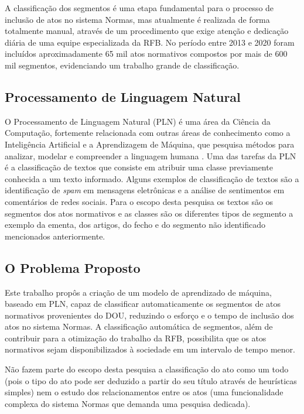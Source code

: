 A classificação dos segmentos é uma etapa fundamental para o processo de inclusão de atos no sistema Normas, mas atualmente é realizada de forma totalmente manual, através de um procedimento que exige atenção e dedicação diária de uma equipe especializada da RFB. No período entre 2013 e 2020 foram incluídos aproximadamente 65 mil atos normativos compostos por mais de 600 mil segmentos, evidenciando um trabalho grande de classificação.

\subsection{Processamento de Linguagem Natural}

O Processamento de Linguagem Natural (PLN) é uma área da Ciência da Computação, fortemente relacionada com outras áreas de conhecimento como a Inteligência Artificial e a Aprendizagem de Máquina, que pesquisa métodos para analizar, modelar e compreender a linguagem humana \cite{PracticalNLP2020}. Uma das tarefas da PLN é a classificação de textos que consiste em atribuir uma classe previamente conhecida a um texto informado. Alguns exemplos de classificação de textos são a identificação de \textit{spam} em mensagens eletrônicas e a análise de sentimentos em comentários de redes sociais. Para o escopo desta pesquisa os textos são os segmentos dos atos normativos e as classes são os diferentes tipos de segmento a exemplo da ementa, dos artigos, do fecho e do segmento não identificado mencionados anteriormente. 

\subsection{O Problema Proposto}

Este trabalho propôs a criação de um modelo de aprendizado de máquina, baseado em PLN, capaz de classificar automaticamente os segmentos de atos normativos provenientes do DOU, reduzindo o esforço e o tempo de inclusão dos atos no sistema Normas. A classificação automática de segmentos, além de contribuir para a otimização do trabalho da RFB, possibilita que os atos normativos sejam disponibilizados à sociedade em um intervalo de tempo menor.

Não fazem parte do escopo desta pesquisa a classificação do ato como um todo (pois o tipo do ato pode ser deduzido a partir do seu título através de heurísticas simples) nem o estudo dos relacionamentos entre os atos (uma funcionalidade complexa do sistema Normas que demanda uma pesquisa dedicada).

